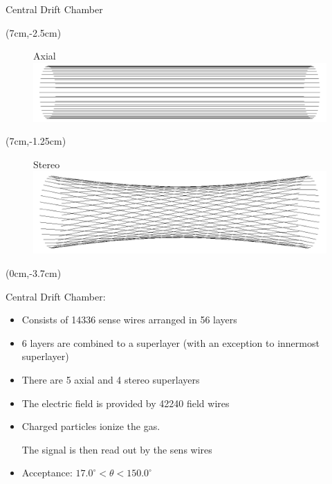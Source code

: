 \documentclass[8pt]{beamer}
\begin{document}
\begin{frame}{Central Drift Chamber}

	\begin{textblock*}{4cm}(7cm,-2.5cm)
		\begin{figure}
			Axial
			\includegraphics[width=\textwidth]{VBilder/axial}
		\end{figure}
	\end{textblock*}

	\begin{textblock*}{4cm}(7cm,-1.25cm)
		
		\begin{figure}
			Stereo
			\includegraphics[width=\textwidth]{VBilder/stereo}
		\end{figure}
	\end{textblock*}




	\begin{textblock*}{10cm}(0cm,-3.7cm)
	
		Central Drift Chamber:
		\begin{itemize}
			\item Consists of 14336 sense wires arranged in 56 layers
			\item 6 layers are combined to a superlayer (with an exception to innermost superlayer)
			\item There are 5 axial and 4 stereo superlayers
			\item The electric field is provided by 42240 field wires
			\item Charged particles ionize the gas. 
			
			The signal is then read out by the sens wires  
			\item Acceptance: $17.0^{\circ} < \theta < 150.0^{\circ}$ 
		\end{itemize}


\end{textblock*}
\end{frame}
\end{document}
